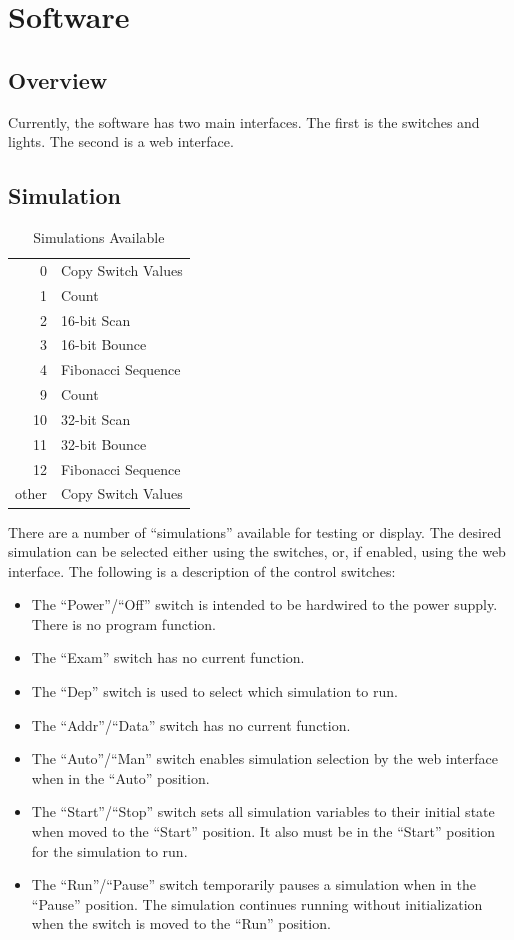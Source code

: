 \documentclass[10pt, openany]{book}
\newcommand{\switch}[2]{``#1''/``#2''}
\newcommand{\position}[1]{``#1''}
\begin{document}
\chapter{Software}
\section{Overview}
Currently, the software has two main interfaces.  The first is the switches and lights.  The second is a web interface.

\section{Simulation}

\begin{table}
  \label{tbl:Simulations}
  \caption{Simulations Available}
  \centering
  \begin{tabular}{|r|l|}
    \hline
    0 & Copy Switch Values\\
    1 & Count\\
    2 & 16-bit Scan\\
    3 & 16-bit Bounce\\
    4 & Fibonacci Sequence\\
    9 & Count\\
    10 & 32-bit Scan\\
    11 & 32-bit Bounce\\
    12 & Fibonacci Sequence\\
    \hline
    other & Copy Switch Values\\
    \hline
  \end{tabular}
\end{table}

There are a number of ``simulations'' available for testing or display.  The desired simulation can be selected either using the switches, or, if enabled, using the web interface.  The following is a description of the control switches:
\begin{itemize}
  \item The \switch{Power}{Off} switch is intended to be hardwired to the power supply.  There is no program function.
  \item The \position{Exam} switch has no current function.
  \item The \position{Dep} switch is used to select which simulation to run.
  \item The \switch{Addr}{Data} switch has no current function.
  \item The \switch{Auto}{Man} switch enables simulation selection by the web interface when in the \position{Auto} position.
  \item The \switch{Start}{Stop} switch sets all simulation variables to their initial state when moved to the \position{Start} position.  It also must be in the \position{Start} position for the simulation to run.
  \item The \switch{Run}{Pause} switch temporarily pauses a simulation when in the \position{Pause} position.  The simulation continues running without initialization when the switch is moved to the \position{Run} position.
\end{itemize}
\end{document}

